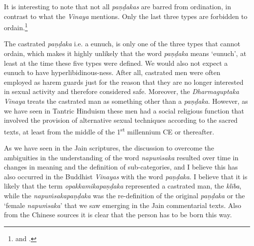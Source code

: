 It is interesting to note that not all {\em paṇḍakas} are barred from ordination, in contrast to what the {\em Vinaya} mentions. Only the last three types are forbidden to ordain.\footnote{\cite{wong} and \cite{thanissaro}.}

The castrated {\em paṇḍaka} i.e. a eunuch, is only one of the three types that cannot ordain, which makes it highly unlikely that the word {\em paṇḍaka} means `eunuch', at least at the time these five types were defined. We would also not expect a eunuch to have hyperlibidinous-ness. After all, castrated men were often employed as harem guards just for the reason that they are no longer interested in sexual activity and therefore considered safe. Moreover, the {\em Dharmaguptaka} {\em Vinaya} treats the castrated man as something other than a {\em paṇḍaka}. However, as we have seen in Tantric Hinduism these men had a social religious function that involved the provision of alternative sexual techniques according to the sacred texts, at least from the middle of the 1\textsuperscript{st} millennium CE or thereafter.

As we have seen in the Jain scriptures, the discussion to overcome the ambiguities in the understanding of the word {\em napuṁsaka} resulted over time in changes in meaning and the definition of sub-categories, and I believe this has also occurred in the Buddhist {\em Vinayas} with the word {\em paṇḍaka}. I believe that it is likely that the term {\em opakkamikapaṇḍaka} represented a castrated man, the {\em klība}, while the {\em napuṁsakapaṇḍaka} was the re-definition of the original {\em paṇḍaka} or the `female {\em napuṁsaka}' that we saw emerging in the Jain commentarial texts. Also from the Chinese sources it is clear that the person has to be born this way.

